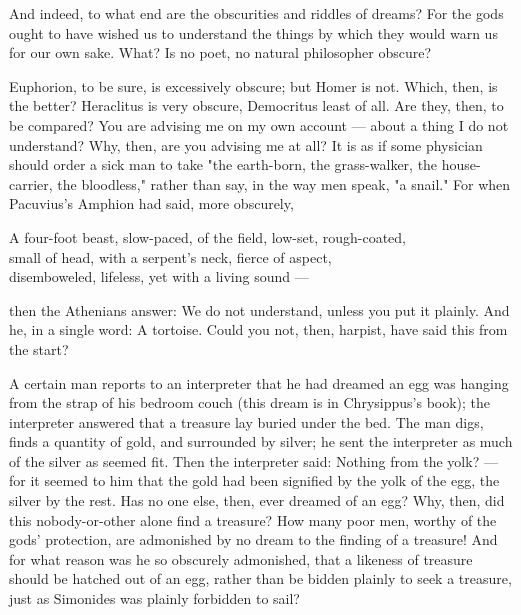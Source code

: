 And indeed, to what end are the obscurities and riddles of dreams? For the gods ought to have wished us to understand the things by which they would warn us for our own sake. What? Is no poet, no natural philosopher obscure?

 Euphorion, to be sure, is excessively obscure; but Homer is not. Which, then, is the better? Heraclitus is very obscure, Democritus least of all. Are they, then, to be compared? You are advising me on my own account — about a thing I do not understand? Why, then, are you advising me at all? It is as if some physician should order a sick man to take "the earth-born, the grass-walker, the house-carrier, the bloodless," rather than say, in the way men speak, "a snail." For when Pacuvius's Amphion had said, more obscurely,

A four-foot beast, slow-paced, of the field, low-set, rough-coated, \\
small of head, with a serpent's neck, fierce of aspect, \\
disemboweled, lifeless, yet with a living sound —

then the Athenians answer: We do not understand, unless you put it plainly. And he, in a single word: A tortoise. Could you not, then, harpist, have said this from the start?

 A certain man reports to an interpreter that he had dreamed an egg was hanging from the strap of his bedroom couch (this dream is in Chrysippus's book); the interpreter answered that a treasure lay buried under the bed. The man digs, finds a quantity of gold, and surrounded by silver; he sent the interpreter as much of the silver as seemed fit. Then the interpreter said: Nothing from the yolk? — for it seemed to him that the gold had been signified by the yolk of the egg, the silver by the rest. Has no one else, then, ever dreamed of an egg? Why, then, did this nobody-or-other alone find a treasure? How many poor men, worthy of the gods' protection, are admonished by no dream to the finding of a treasure! And for what reason was he so obscurely admonished, that a likeness of treasure should be hatched out of an egg, rather than be bidden plainly to seek a treasure, just as Simonides was plainly forbidden to sail?

